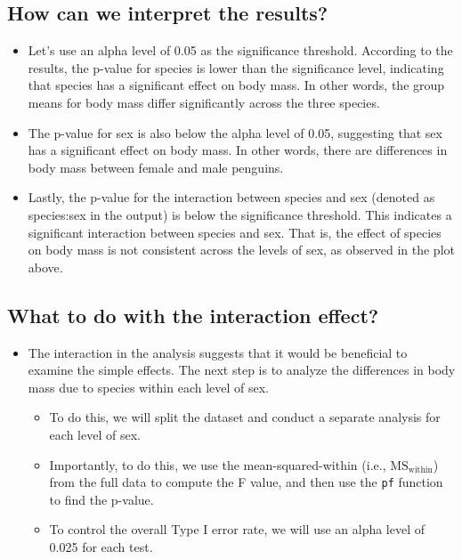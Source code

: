 \documentclass[
]{book}
\begin{document}
\subsection{How can we interpret the results?}\label{how-can-we-interpret-the-results-1}

\begin{itemize}
\item
  Let's use an alpha level of 0.05 as the significance threshold. According to the results, the p-value for species is lower than the significance level, indicating that species has a significant effect on body mass. In other words, the group means for body mass differ significantly across the three species.
\item
  The p-value for sex is also below the alpha level of 0.05, suggesting that sex has a significant effect on body mass. In other words, there are differences in body mass between female and male penguins.
\item
  Lastly, the p-value for the interaction between species and sex (denoted as species:sex in the output) is below the significance threshold. This indicates a significant interaction between species and sex. That is, the effect of species on body mass is not consistent across the levels of sex, as observed in the plot above.
\end{itemize}

\subsection{What to do with the interaction effect?}\label{what-to-do-with-the-interaction-effect}

\begin{itemize}
\item
  The interaction in the analysis suggests that it would be beneficial to examine the simple effects. The next step is to analyze the differences in body mass due to species within each level of sex.

  \begin{itemize}
  \item
    To do this, we will split the dataset and conduct a separate analysis for each level of sex.
  \item
    Importantly, to do this, we use the mean-squared-within (i.e., \(\text{MS}_{\text{within}}\)) from the full data to compute the F value, and then use the \texttt{pf} function to find the p-value.
  \item
    To control the overall Type I error rate, we will use an alpha level of 0.025 for each test.
  \end{itemize}
\end{itemize}
\end{document}
